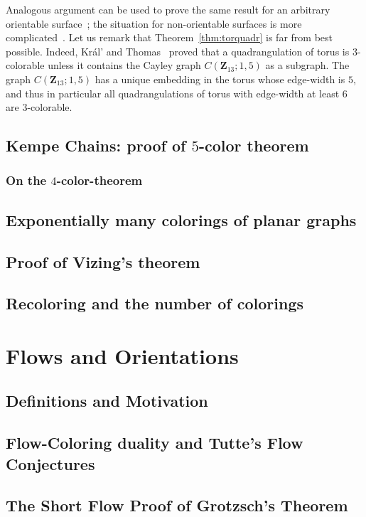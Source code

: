 \documentclass[12pt,twoside,openright,a4paper]{book}
\begin{document}
Analogous argument can be used to prove the same result for an arbitrary orientable surface~\cite{locplanq};
the situation for non-orientable surfaces is more complicated~\cite{MohSey,NakNegOta}.
Let us remark that Theorem~\ref{thm:torquadr} is far from best possible.  Indeed, Kr\'al' and Thomas~\cite{thomas2008coloring}
proved that a quadrangulation of torus is $3$-colorable unless it contains the Cayley graph $C(\mathbf{Z}_{13}; 1,5)$ as a subgraph.
The graph $C(\mathbf{Z}_{13}; 1,5)$ has a unique embedding in the torus whose edge-width is $5$, and thus in particular all quadrangulations
of torus with edge-width at least $6$ are $3$-colorable.

\section{Kempe Chains: proof of $5$-color theorem}

\subsection{On the $4$-color-theorem}

\section{Exponentially many colorings of planar graphs}

\section{Proof of Vizing's theorem}

\section{Recoloring and the number of colorings}

\chapter{Flows and Orientations}\label{chap:flows}
\section{Definitions and Motivation}
\section{Flow-Coloring duality and Tutte's Flow Conjectures}
\section{The Short Flow Proof of Grotzsch's Theorem}
\end{document}
